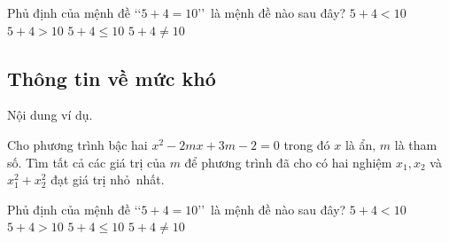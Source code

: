 \documentclass[Main.tex]{subfiles}
\begin{document}
	\begin{exsao}
		Phủ định của mệnh đề \lq\lq$5+4=10$\rq\rq\ là mệnh đề nào sau đây?
		\choice
		{$5+4<10$}
		{$5+4>10$}
		{$5+4\le 10$}
		{\True $5+4\ne 10$}
	\end{exsao}
	
	\subsection{Thông tin về mức khó}
	
	\begin{vdsao}
		Nội dung ví dụ.
	\end{vdsao}
	
	\begin{btsao}
		Cho phương trình bậc hai $x^2-2 m x+3 m-2=0$ trong đó $x$ là ẩn, $m$ là tham số. Tìm tất cả các giá trị của $m$ để phương trình đã cho có hai nghiệm $x_1, x_2$ và $x_1^2+x_2^2$ đạt giá trị nhỏ~nhất.
	\end{btsao}
	
	\begin{exsao}
		Phủ định của mệnh đề \lq\lq$5+4=10$\rq\rq\ là mệnh đề nào sau đây?
		\choice
		{$5+4<10$}
		{$5+4>10$}
		{$5+4\le 10$}
		{\True $5+4\ne 10$}
	\end{exsao}
\end{document}
